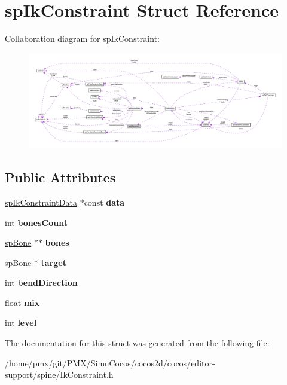 \hypertarget{structspIkConstraint}{}\section{sp\+Ik\+Constraint Struct Reference}
\label{structspIkConstraint}


Collaboration diagram for sp\+Ik\+Constraint\+:
\nopagebreak
\begin{figure}[H]
\begin{center}
\leavevmode
\includegraphics[width=350pt]{structspIkConstraint__coll__graph}
\end{center}
\end{figure}
\subsection*{Public Attributes}
\begin{DoxyCompactItemize}
\item 
\mbox{\label{structspIkConstraint_a19a9c986b2da014b9c2917b202725277}} 
\hyperlink{structspIkConstraintData}{sp\+Ik\+Constraint\+Data} $\ast$const {\bfseries data}
\item 
\mbox{\label{structspIkConstraint_a63ee45226f8d58dde1091356b642b00f}} 
int {\bfseries bones\+Count}
\item 
\mbox{\label{structspIkConstraint_a38e27bd734a43cf4baab263a96a9fcfd}} 
\hyperlink{structspBone}{sp\+Bone} $\ast$$\ast$ {\bfseries bones}
\item 
\mbox{\label{structspIkConstraint_aa44d0e7252430a633b8724e28965fd07}} 
\hyperlink{structspBone}{sp\+Bone} $\ast$ {\bfseries target}
\item 
\mbox{\label{structspIkConstraint_a59fb39adad8df3124daca648cb6455a6}} 
int {\bfseries bend\+Direction}
\item 
\mbox{\label{structspIkConstraint_abc1d62e944355333bf32dbccbf2c4828}} 
float {\bfseries mix}
\item 
\mbox{\label{structspIkConstraint_a52d7a8764aa36de9cb6cf00f6b7701d4}} 
int {\bfseries level}
\end{DoxyCompactItemize}


The documentation for this struct was generated from the following file\+:\begin{DoxyCompactItemize}
\item 
/home/pmx/git/\+P\+M\+X/\+Simu\+Cocos/cocos2d/cocos/editor-\/support/spine/Ik\+Constraint.\+h\end{DoxyCompactItemize}
